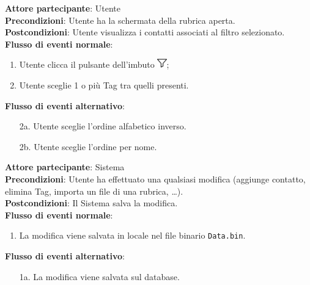 \begin{tcolorbox}[colback=white,colframe=black!80!white,title=\textbf{C7 - Visualizzare rubrica con filtri}]
	\textbf{Attore partecipante}: Utente
	\\\textbf{Precondizioni}: Utente ha la schermata della rubrica aperta.
	\\\textbf{Postcondizioni}: Utente visualizza i contatti associati al filtro selezionato.
	\\\textbf{Flusso di eventi normale}:
	\begin{enumerate}[noitemsep, topsep=0pt]
		\item Utente clicca il pulsante dell’imbuto \includegraphics[height=0.4cm]{images/imbuto_icona.jpeg};
		\item Utente sceglie 1 o più Tag tra quelli presenti.
	\end{enumerate}
	\textbf{Flusso di eventi alternativo}:
	\begin{itemize}[noitemsep, topsep=0pt]
		\item[2a.] Utente sceglie l’ordine alfabetico inverso.
		\item[2b.] Utente sceglie l’ordine per nome.
	\end{itemize}
\end{tcolorbox}

\begin{tcolorbox}[colback=white,colframe=black!80!white,title=\textbf{C8 - Salvare rubrica}]
	\textbf{Attore partecipante}: Sistema
	\\\textbf{Precondizioni}: Utente ha effettuato una qualsiasi modifica (aggiunge contatto, elimina Tag, importa un file di una rubrica, …). 
	\\\textbf{Postcondizioni}: Il Sistema salva la modifica.
	\\\textbf{Flusso di eventi normale}:
	\begin{enumerate}[noitemsep, topsep=0pt]
		\item La modifica viene salvata in locale nel file binario \texttt{Data.bin}.
	\end{enumerate}
	\textbf{Flusso di eventi alternativo}:
	\begin{itemize}[noitemsep, topsep=0pt]
		\item[1a.] La modifica viene salvata sul database.
	\end{itemize}
\end{tcolorbox}

